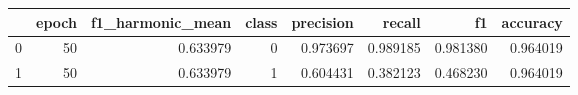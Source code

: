 \begin{tabular}{lrrrrrrr}
\toprule
 & epoch & f1_harmonic_mean & class & precision & recall & f1 & accuracy \\
\midrule
0 & 50 & 0.633979 & 0 & 0.973697 & 0.989185 & 0.981380 & 0.964019 \\
1 & 50 & 0.633979 & 1 & 0.604431 & 0.382123 & 0.468230 & 0.964019 \\
\bottomrule
\end{tabular}
